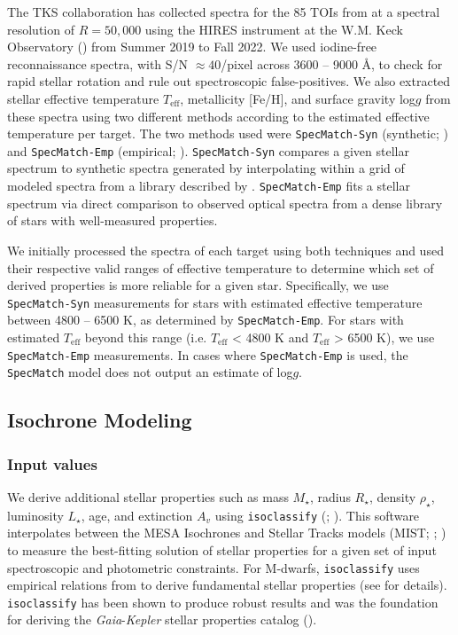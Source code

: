 \documentclass[twocolumn]{aastex63}
\begin{document}
The TKS collaboration has collected spectra for the 85 TOIs from \cite{Chontos22} at a spectral resolution of $R = 50,000$ using the HIRES instrument at the W.M. Keck Observatory (\citealt{Vogt94}) from Summer 2019 to Fall 2022. We used iodine-free reconnaissance spectra, with S/N $\approx 40$/pixel across 3600 -- 9000 \AA, to check for rapid stellar rotation and rule out spectroscopic false-positives. We also extracted stellar effective temperature $T_\textrm{eff}$, metallicity [Fe/H], and surface gravity log$g$ from these spectra using two different methods according to the estimated effective temperature per target. The two methods used were \texttt{SpecMatch-Syn} (synthetic; \citealt{Petigura15}) and \texttt{SpecMatch-Emp} (empirical; \citealt{Yee17}). \texttt{SpecMatch-Syn} compares a given stellar spectrum to synthetic spectra generated by interpolating within a grid of modeled spectra from a library described by \cite{Coelho05}. \texttt{SpecMatch-Emp} fits a stellar spectrum via direct comparison to observed optical spectra from a dense library of stars with well-measured properties.

We initially processed the spectra of each target using both techniques and used their respective valid ranges of effective temperature to determine which set of derived properties is more reliable for a given star. Specifically, we use \texttt{SpecMatch-Syn} measurements for stars with estimated effective temperature between 4800 -- 6500 K, as determined by \texttt{SpecMatch-Emp}. For stars with estimated $T_\textrm{eff}$ beyond this range (i.e. $T_\textrm{eff}$ < 4800 K and $T_\textrm{eff}$ > 6500 K), we use \texttt{SpecMatch-Emp} measurements. In cases where \texttt{SpecMatch-Emp} is used, the \texttt{SpecMatch} model does not output an estimate of log$g$.

\subsection{Isochrone Modeling}
\label{sec:isochrone}

\subsubsection{Input values}
\label{sec:isoclassify}

We derive additional stellar properties such as mass $M_{\star}$, radius $R_{\star}$, density $\rho_{\star}$, luminosity $L_{\star}$, age, and extinction $A_v$ using \texttt{isoclassify} (\citealt{Berger20a}; \citealt{Huber17}). This software interpolates between the MESA Isochrones and Stellar Tracks models (MIST; \citealt{Dotter16}; \citealt{Choi16a}) to measure the best-fitting solution of stellar properties for a given set of input spectroscopic and photometric constraints. For M-dwarfs, \texttt{isoclassify} uses empirical relations from \cite{Mann19} to derive fundamental stellar properties (see \citealt{Berger20a} for details). \texttt{isoclassify} has been shown to produce robust results and was the foundation for deriving the \emph{Gaia}-\emph{Kepler} stellar properties catalog (\citealt{Berger20a}). 
\end{document}
